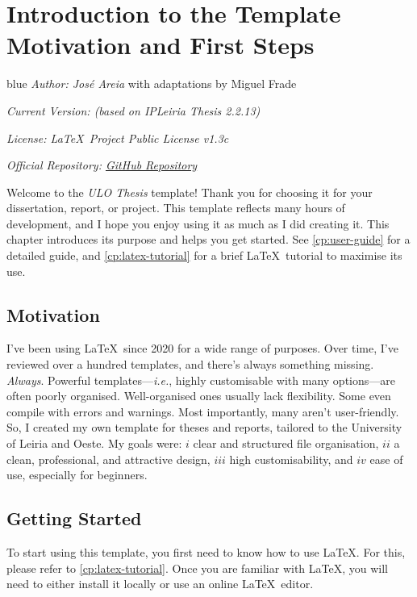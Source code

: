 \chapter[Introduction to the Template: Motivation and First Steps]{Introduction to the Template Motivation and First Steps}
\label{cp:introduction}

{ %
    \parindent0pt

    \begin{color}{blue}
        \textit{Author: José Areia} with adaptations by Miguel Frade

        \textit{Current Version: \TemplateVersion{} (based on IPLeiria Thesis 2.2.13)}

        \textit{License: \LaTeX~Project Public License v1.3c}

        \textit{Official Repository: \href{https://github.com/mfrade/ULO-thesis}{GitHub Repository}}
    \end{color}

    \vspace{.935em}

    Welcome to the \textcolor{maincolor}{\textit{ULO Thesis}} template! Thank you for choosing it for your dissertation, report, or project. This template reflects many hours of development, and I hope you enjoy using it as much as I did creating it. This chapter introduces its purpose and helps you get started. See \autoref{cp:user-guide} for a detailed guide, and \autoref{cp:latex-tutorial} for a brief \LaTeX~tutorial to maximise its use.
}

\section{Motivation}
I've been using \LaTeX~since 2020 for a wide range of purposes. Over time, I've reviewed over a hundred templates, and there's always something missing. \textit{Always}. Powerful templates---\textit{i.e.}, highly customisable with many options---are often poorly organised. Well-organised ones usually lack flexibility. Some even compile with errors and warnings. Most importantly, many aren't user-friendly. So, I created my own template for theses and reports, tailored to the University of Leiria and Oeste. My goals were: \(i\) clear and structured file organisation, \(ii\) a clean, professional, and attractive design, \(iii\) high customisability, and \(iv\) ease of use, especially for beginners.


\section{Getting Started}
To start using this template, you first need to know how to use \LaTeX. For this, please refer to \autoref{cp:latex-tutorial}. Once you are familiar with \LaTeX, you will need to either install it locally or use an online \LaTeX~editor.

